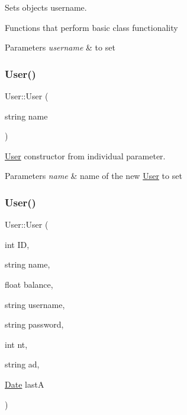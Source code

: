 Sets object\textquotesingle{}s username. 

Functions that perform basic class functionality 
\begin{DoxyParams}{Parameters}
{\em username} & to set \\
\hline
\end{DoxyParams}
\mbox{\label{group___user_gab4d18a829f31eae091669ac36782a396}} 
\subsubsection{\texorpdfstring{User()}{User()}\hspace{0.1cm}{\footnotesize\ttfamily [1/2]}}
{\footnotesize\ttfamily User\+::\+User (\begin{DoxyParamCaption}\item[{string}]{name }\end{DoxyParamCaption})}



\hyperlink{class_user}{User} constructor from individual parameter. 


\begin{DoxyParams}{Parameters}
{\em name} & name of the new \hyperlink{class_user}{User} to set \\
\hline
\end{DoxyParams}
\mbox{\label{group___user_ga4cad036bd4872821fa6c2585c8778461}} 
\subsubsection{\texorpdfstring{User()}{User()}\hspace{0.1cm}{\footnotesize\ttfamily [2/2]}}
{\footnotesize\ttfamily User\+::\+User (\begin{DoxyParamCaption}\item[{int}]{ID,  }\item[{string}]{name,  }\item[{float}]{balance,  }\item[{string}]{username,  }\item[{string}]{password,  }\item[{int}]{nt,  }\item[{string}]{ad,  }\item[{\hyperlink{class_date}{Date}}]{lastA }\end{DoxyParamCaption})}



